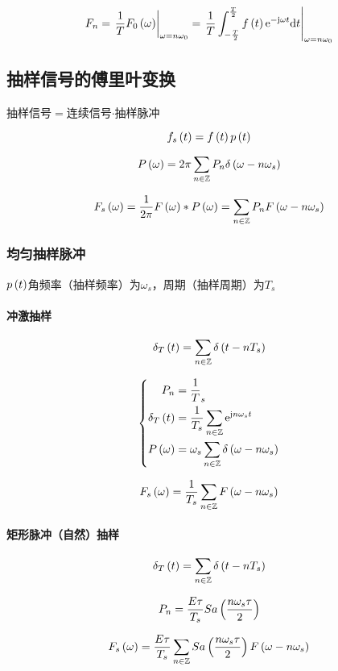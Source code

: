 \documentclass{article}
\begin{document}
\[F_n=\left.\frac1TF_0\left(\omega\right)\right|_{\omega=n\omega_0}=\left.\frac1T\int_{-\frac T2}^{\frac T2}f\left(t\right)\mathrm e^{-\mathrm j\omega t}\mathrm d t\right|_{\omega=n\omega_0}\]

\subsection{抽样信号的傅里叶变换}

抽样信号$=$连续信号$\cdot$抽样脉冲

\[f_s\left(t\right)=f\left(t\right) p\left(t\right)\]

\[P\left(\omega\right)=2\pi\sum_{n\in\mathbb Z} P_n\delta\left(\omega-n\omega_s\right)\]

\[F_s\left(\omega\right)=\frac1{2\pi}F\left(\omega\right)\ast P\left(\omega\right)=\sum_{n\in\mathbb Z} P_nF\left(\omega-n\omega_s\right)\]

\subsubsection{均匀抽样脉冲}

$p\left(t\right)$角频率（抽样频率）为$\omega_s$，周期（抽样周期）为$T_s$

\paragraph{冲激抽样}

\[\delta_T\left(t\right)=\sum_{n\in\mathbb Z}\delta\left(t-nT_s\right)\]

\[\left\{\begin{aligned}
        P_n              & =\frac1T_s                                   \\
        \delta_T\left(t\right) & =\frac1{T_s}\sum_{n\in\mathbb Z}\mathrm e^{\mathrm j n\omega_s t}        \\
        P\left(\omega\right)   & =\omega_s\sum_{n\in\mathbb Z}\delta\left(\omega-n\omega_s\right)
    \end{aligned}\right.\]

\[F_s\left(\omega\right)=\frac1{T_s}\sum_{n\in\mathbb Z} F\left(\omega-n\omega_s\right)\]

\paragraph{矩形脉冲（自然）抽样}

\[\delta_T\left(t\right)=\sum_{n\in\mathbb Z}\delta\left(t-nT_s\right)\]

\[P_n=\frac{E\tau}{T_s}Sa\left(\frac{n\omega_s\tau}2\right)\]

\[F_s\left(\omega\right)=\frac{E\tau}{T_s}\sum_{n\in\mathbb Z} Sa\left(\frac{n\omega_s\tau}2\right)F\left(\omega-n\omega_s\right)\]
\end{document}
